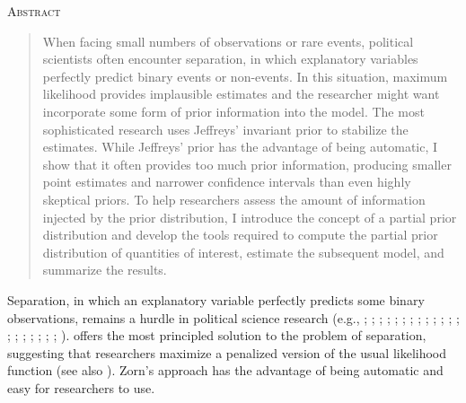 \documentclass[12pt]{article}
\begin{document}
\vspace{10mm}
{\centerline{\textsc{Abstract}}}
\begin{quote}
\noindent When facing small numbers of observations or rare events, political scientists often encounter separation, in which explanatory variables perfectly predict binary events or non-events. 
In this situation, maximum likelihood provides implausible estimates and the researcher might want incorporate some form of prior information into the model. 
The most sophisticated research uses Jeffreys' invariant prior to stabilize the estimates. 
While Jeffreys' prior has the advantage of being automatic, I show that it often provides too much prior information, producing smaller point estimates and narrower confidence intervals than even highly skeptical priors. 
To help researchers assess the amount of information injected by the prior distribution, I introduce the concept of a partial prior distribution and develop the tools required to compute the partial prior distribution of quantities of interest, estimate the subsequent model, and summarize the results.
\end{quote}


\newpage
\doublespace

Separation, in which an explanatory variable perfectly predicts some binary observations, remains a hurdle in political science research (e.g., \citealt{BellMiller2015}; \citealt{Mares2015}; \citealt{ViningWilhelmCollens2015}; \citealt{BrownKaplow2014}; \citealt{BarrilleauxRainey2014};  \citealt{LeemanMares2014}; \citealt{Reiter2014}; \citealt{Weisiger2014}; \citealt{MinozziVolden2013}; \citealt{CedermeanGleditschHug2013}; \citealt{Fuhrmann2012}; \citealt{RoccaSanchezMorin2011}; \citealt{PetersonDrury2011}; \citealt{CoxKousserMcCubbins2010}; \citealt{Ahlquist2010}; \citealt{Rauchhaus2009}; \citealt{SmithFridkin2008}; \citealt{Casellas2008}; \citealt{DesposatoScheiner2008}; \citealt{HellerMershon2008}; \citealt{DeRouenBercovitch2008}).
\cite{Zorn2005} offers the most principled solution to the problem of separation, suggesting that researchers maximize a penalized version \citep{Firth1993} of the usual likelihood function (see also \citealt{HeinzeSchemper2002}). 
Zorn's approach has the advantage of being automatic and easy for researchers to use.
\end{document}

